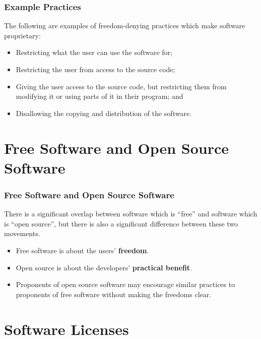 \documentclass{beamer}
\begin{document}

\begin{frame}
\frametitle{Example Practices}

The following are examples of freedom-denying practices which make software 
proprietary:

\begin{itemize}
\item<+-> Restricting what the user can use the software for;
\item<+-> Restricting the user from access to the source code;
\item<+-> Giving the user access to the source code, but restricting them 
  from modifying it or using parts of it in their program; and
\item<+-> Disallowing the copying and distribution of the software.
\end{itemize}

\end{frame}


\section{Free Software and Open Source Software}

\begin{frame}
\frametitle{Free Software and Open Source Software}

There is a significant overlap between software which is ``free'' 
and software which is ``open source'', but there is also a significant 
difference between these two movements.

\begin{itemize}
\item<+-> Free software is about the users' {\bf freedom}.
\item<+-> Open source is about the developers' {\bf practical benefit}.
\item<+-> Proponents of open source software may encourage similar practices 
  to proponents of free software without making the freedoms clear.
\end{itemize}

\end{frame}


\section{Software Licenses}
\end{document}
